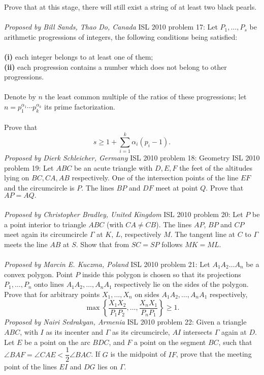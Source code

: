 Prove that at this stage, there will still exist a string of at least two black pearls. \\\\
\textit{Proposed by Bill Sands, Thao Do, Canada} 
ISL 2010 problem 17:  Let $P_1, \ldots , P_s$ be arithmetic progressions of integers, the following conditions being satisfied: \\\\
\textbf{(i)} each integer belongs to at least one of them; \\
\textbf{(ii)} each progression contains a number which does not belong to other progressions. \\\\
Denote by $n$ the least common multiple of the ratios of these progressions; let $n=p_1^{\alpha_1} \cdots p_k^{\alpha_k}$ its prime factorization. \\\\
Prove that
\[ s \geq 1 + \sum^k_{i=1} \alpha_i (p_i - 1). \]
\textit{Proposed by Dierk Schleicher, Germany} 
ISL 2010 problem 18:  Geometry 
ISL 2010 problem 19:  Let $ABC$ be an acute triangle with $D, E, F$ the feet of the altitudes lying on $BC, CA, AB$ respectively. One of the intersection points of the line $EF$ and the circumcircle is $P.$ The lines $BP$ and $DF$ meet at point $Q.$ Prove that $AP = AQ.$ \\\\
\textit{Proposed by Christopher Bradley, United Kingdom} 
ISL 2010 problem 20:  Let $P$ be a point interior to triangle $ABC$ (with $CA \neq CB$). The lines $AP$, $BP$ and $CP$ meet again its circumcircle $\Gamma$ at $K$, $L$, respectively $M$. The tangent line at $C$ to $\Gamma$ meets the line $AB$ at $S$. Show that from $SC = SP$ follows $MK = ML$. \\\\
\textit{Proposed by Marcin E. Kuczma, Poland} 
ISL 2010 problem 21:  Let $A_1A_2 \ldots A_n$ be a convex polygon. Point $P$ inside this polygon is chosen so that its projections $P_1, \ldots , P_n$ onto lines $A_1A_2, \ldots , A_nA_1$ respectively lie on the sides of the polygon. Prove that for arbitrary points $X_1, \ldots , X_n$ on sides $A_1A_2, \ldots , A_nA_1$ respectively,
\[ \max \left\{ \frac{X_1X_2}{P_1P_2}, \ldots, \frac{X_nX_1}{P_nP_1} \right\} \geq 1. \]
\textit{Proposed by Nairi Sedrakyan, Armenia} 
ISL 2010 problem 22:  Given a triangle $ABC$, with $I$ as its incenter and $\Gamma$ as its circumcircle, $AI$ intersects $\Gamma$ again at $D$. Let $E$ be a point on the arc $BDC$, and $F$ a point on the segment $BC$, such that $\angle BAF=\angle CAE < \dfrac12\angle BAC$. If $G$ is the midpoint of $IF$, prove that the meeting point of the lines $EI$ and $DG$ lies on $\Gamma$. \\\\
